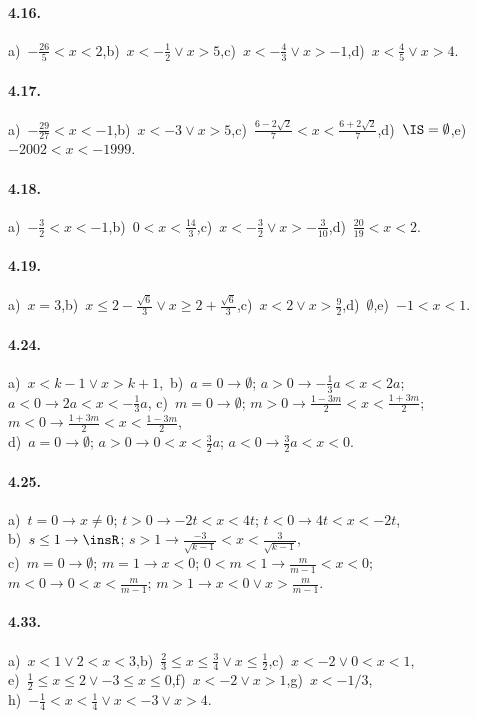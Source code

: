 \paragraph{4.16.} a)~$-\frac{26}{5}<x<2$,\quad b)~$x<-\frac 1 2\vee x>5$,\quad c)~$x<-\frac 4 3\vee x>-1$,\quad d)~$x<\frac{4}{5}\vee x>4$.

\paragraph{4.17.} a)~$-\frac{29}{27}<x<-1$,\quad b)~$x<-3\vee x>5$,\quad c)~$\frac{6-2\sqrt 2} 7<x<\frac{6+2\sqrt 2} 7$,\quad d)~$\IS=\emptyset $,\quad e)~$-2002<x<-1999$.

\paragraph{4.18.} a)~$-\frac{3}{2}<x<-1$,\quad b)~$0<x<\frac{14}{3}$,\quad c)~$x<-\frac{3}{2}\vee x>-\frac{3}{10}$,\quad d)~$\frac{20}{19}<x<2$.

\paragraph{4.19.} a)~$x=3$,\quad b)~$x\le 2-\frac{\sqrt 6} 3\vee x\ge 2+\frac{\sqrt 6} 3$,\quad c)~$x<2\vee x>\frac{9}{2}$,\quad d)~$\emptyset$,\quad e)~$-1<x<1$.

\paragraph{4.24.} a)~$x<k-1\vee x>k+1$,\, b)~$a=0\to \emptyset$; $a>0\to -\frac 1 3a<x<2a$; $a<0\to 2a<x<-\frac 1 3a$,\quad 
c)~$m=0\to \emptyset$; $m>0\to \frac{1-3m}2<x<\frac{1+3m} 2$; $m<0\to \frac{1+3m} 2<x<\frac{1-3m} 2$,\protect\\
d)~$a=0\to \emptyset$; $a>0\to 0<x<\frac 3 2a$; $a<0\to \frac 3 2a<x<0$.

\paragraph{4.25.} a)~$t=0\to x\neq 0$; $t>0\to -2t<x<4t$; $t<0\to 4t<x<-2t$,\protect\\
b)~$s\le 1\to \insR$; $s>1\to \frac{-3}{\sqrt{k-1}}<x<\frac 3{\sqrt{k-1}}$,\protect\\
c)~$m=0\to \emptyset$; $m=1\to x<0$; $0<m<1\to \frac m{m-1}<x<0$; $m<0\to 0<x<\frac m{m-1}$; $m>1\to x<0\vee x>\frac m{m-1}$.

\paragraph{4.33.} a)~$x<1\vee 2<x<3$,\quad b)~$\frac 2 3\le x\le \frac 3 4\vee x\le \frac 1 2$,\quad c)~$x<-2\vee 0<x<1$,\protect\\
e)~$\frac 1 2\le x\le 2\vee -3\le x\le 0$,\quad f)~$x<-2\vee x>1$,\quad g)~$x<-1/3$,\protect\\
h)~$-\frac 1 4<x<\frac 1 4\vee x<-3\vee x>4$.

